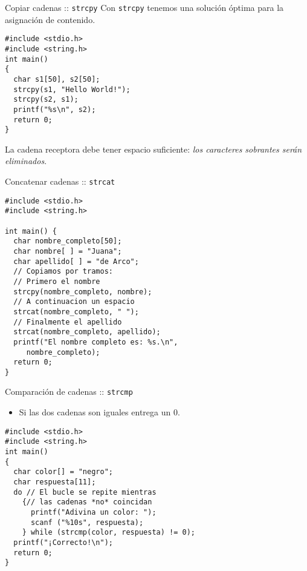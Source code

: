 \documentclass[xcolor={usenames,svgnames,dvipsnames}, aspectratio=169]{beamer}
\begin{document}
\begin{frame}[label={sec:org8b56290},fragile]{Copiar cadenas :: \texttt{strcpy}}
 Con \texttt{strcpy} tenemos una solución óptima para la \alert{asignación de contenido}.

\lstset{language=C,label= ,caption= ,captionpos=b,numbers=none}
\begin{lstlisting}
#include <stdio.h>
#include <string.h>
int main()
{
  char s1[50], s2[50];
  strcpy(s1, "Hello World!");
  strcpy(s2, s1);
  printf("%s\n", s2);
  return 0;
}
\end{lstlisting}

\begin{block}{}
La cadena receptora debe tener espacio suficiente: \emph{los caracteres sobrantes serán eliminados}.
\end{block}
\end{frame}

\begin{frame}[label={sec:org2bcb2fd},fragile]{Concatenar cadenas :: \texttt{strcat}}
 \lstset{language=C,label= ,caption= ,captionpos=b,numbers=none}
\begin{lstlisting}
#include <stdio.h>
#include <string.h>

int main() {
  char nombre_completo[50];
  char nombre[ ] = "Juana";
  char apellido[ ] = "de Arco";
  // Copiamos por tramos:
  // Primero el nombre
  strcpy(nombre_completo, nombre);
  // A continuacion un espacio
  strcat(nombre_completo, " ");
  // Finalmente el apellido
  strcat(nombre_completo, apellido);
  printf("El nombre completo es: %s.\n",
	 nombre_completo);
  return 0;
}
\end{lstlisting}
\end{frame}

\begin{frame}[label={sec:orgfa61162},fragile]{Comparación de cadenas :: \texttt{strcmp}}
 \begin{itemize}
\item \alert{Si las dos cadenas son iguales entrega un 0}.
\end{itemize}

\lstset{language=C,label= ,caption= ,captionpos=b,numbers=none}
\begin{lstlisting}
#include <stdio.h>
#include <string.h>
int main()
{
  char color[] = "negro";
  char respuesta[11];
  do // El bucle se repite mientras
    {// las cadenas *no* coincidan
      printf("Adivina un color: ");
      scanf ("%10s", respuesta);
    } while (strcmp(color, respuesta) != 0);
  printf("¡Correcto!\n");
  return 0;
}
\end{lstlisting}
\end{frame}
\end{document}
